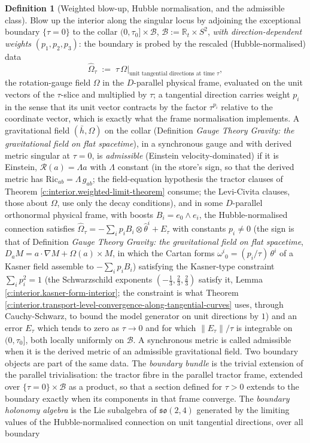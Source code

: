 \documentclass[11pt]{article}
\theoremstyle{definition}
\newtheorem{definition}[theorem]{Definition}
\theoremstyle{plain}
\newcommand{\changedmark}[2]{\marginpar{\raggedright\scriptsize\color{#1}#2}}
\providecommand{\R}{}\renewcommand{\R}{\mathbb{R}}
\providecommand{\Ric}{}\renewcommand{\Ric}{\mathrm{Ric}}
\providecommand{\hb}{}\renewcommand{\hb}{\bar{h}}
\begin{document}
\begin{definition}[Weighted blow-up, Hubble normalisation, and the admissible class]\label{c:obj.interior.weighted-blow-up-hubble-normalisation-admissible}
\changedmark{BurntOrange}{changed since the deposit}
Blow up the interior along the singular locus by adjoining the exceptional boundary $\{\tau = 0\}$ to the collar $(0,\tau_0] \times \mathcal{B}$, $\mathcal{B} := \R_t \times S^2$, \emph{with direction-dependent weights} $(p_1, p_2, p_3)$: the boundary is probed by the rescaled (Hubble-normalised) data
\[
\widehat\Omega_\tau \;:=\; \tau\,\Omega\big|_{\text{unit tangential directions at time } \tau},
\]
the rotation-gauge field $\Omega$ in the $D$-parallel physical frame, evaluated on the unit vectors of the $\tau$-slice and multiplied by $\tau$; a tangential direction carries weight $p_i$ in the sense that its unit vector contracts by the factor $\tau^{p_i}$ relative to the coordinate vector, which is exactly what the frame normalisation implements. A gravitational field $(\hb, \Omega)$ on the collar (Definition \emph{Gauge Theory Gravity: the gravitational field on flat spacetime}), in a synchronous gauge and with derived metric singular at $\tau = 0$, is \emph{admissible} (Einstein velocity-dominated) if it is Einstein, $\mathcal{R}(a) = \Lambda a$ with $\Lambda$ constant (in the store's sign, so that the derived metric has $\Ric_{ab} = \Lambda\, g_{ab}$; the field-equation hypothesis the tractor clauses of Theorem \ref{c:interior.weighted-limit-theorem} consume; the Levi-Civita clauses, those about $\Omega$, use only the decay conditions), and in some $D$-parallel orthonormal physical frame, with boosts $B_i = e_0 \wedge e_i$, the Hubble-normalised connection satisfies $\widehat\Omega_\tau = -\sum_i p_i B_i \otimes \hat\theta^i + E_\tau$ with constants $p_i \neq 0$ (the sign is that of Definition \emph{Gauge Theory Gravity: the gravitational field on flat spacetime}, $D_a M = a \cdot \nabla M + \Omega(a) \times M$, in which the Cartan forms $\omega^{i}{}_{0} = (p_i/\tau)\,\theta^i$ of a Kasner field assemble to $-\sum_i p_i B_i$) satisfying the Kasner-type constraint $\sum_i p_i^2 = 1$ (the Schwarzschild exponents $(-\tfrac13, \tfrac23, \tfrac23)$ satisfy it, Lemma \ref{c:interior.kasner-form-interior}; the constraint is what Theorem \ref{c:interior.transport-level-convergence-along-tangential-curves} uses, through Cauchy-Schwarz, to bound the model generator on unit directions by $1$) and an error $E_\tau$ which tends to zero as $\tau \to 0$ and for which $\|E_\tau\|/\tau$ is integrable on $(0, \tau_0]$, both locally uniformly on $\mathcal{B}$. A synchronous metric is called admissible when it is the derived metric of an admissible gravitational field. Two boundary objects are part of the same data. The \emph{boundary bundle} is the trivial extension of the parallel trivialisation: the tractor fibre in the parallel tractor frame, extended over $\{\tau = 0\} \times \mathcal{B}$ as a product, so that a section defined for $\tau > 0$ extends to the boundary exactly when its components in that frame converge. The \emph{boundary holonomy algebra} is the Lie subalgebra of $\mathfrak{so}(2,4)$ generated by the limiting values of the Hubble-normalised connection on unit tangential directions, over all boundary 
\end{definition}
\end{document}
